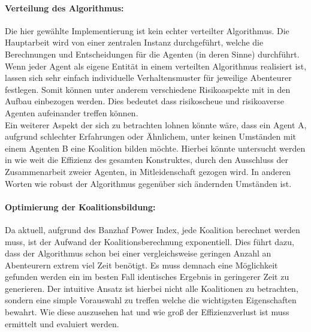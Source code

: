 \documentclass[fleqn,10pt]{SelfArx} %
\begin{document}
\paragraph{Verteilung des Algorithmus:}
Die hier gewählte Implementierung ist kein echter verteilter Algorithmus. Die Hauptarbeit wird von einer zentralen Instanz durchgeführt, welche die Berechnungen und Entscheidungen für die Agenten (in deren Sinne) durchführt. Wenn jeder Agent als eigene Entität in einem verteilten Algorithmus realisiert ist, lassen sich sehr einfach individuelle Verhaltensmuster für jeweilige Abenteurer festlegen. Somit können unter anderem verschiedene Risikoaspekte mit in den Aufbau einbezogen werden. Dies bedeutet dass risikoscheue und risikoaverse Agenten aufeinander treffen können. \\
Ein weiterer Aspekt der sich zu betrachten lohnen könnte wäre, dass ein Agent A, aufgrund schlechter Erfahrungen oder Ähnlichem, unter keinen Umständen mit einem Agenten B eine Koalition bilden möchte. Hierbei könnte untersucht werden in wie weit die Effizienz des gesamten Konstruktes, durch den Ausschluss der Zusammenarbeit zweier Agenten, in Mitleidenschaft gezogen wird. In anderen Worten wie robust der Algorithmus gegenüber sich ändernden Umständen ist.

\paragraph{Optimierung der Koalitionsbildung:}
Da aktuell, aufgrund des Banzhaf Power Index, jede Koalition berechnet werden muss, ist der Aufwand der Koalitionsberechnung exponentiell. Dies führt dazu, dass der Algorithmus schon bei einer vergleichsweise geringen Anzahl an Abenteurern extrem viel Zeit benötigt. Es muss demnach eine Möglichkeit gefunden werden ein im besten Fall identisches Ergebnis in geringerer Zeit zu generieren. Der intuitive Ansatz ist hierbei nicht alle Koalitionen zu betrachten, sondern eine simple Vorauswahl zu treffen welche die wichtigsten Eigenschaften bewahrt. Wie diese auszusehen hat und wie groß der Effizienzverlust ist muss ermittelt und evaluiert werden.
\end{document}
